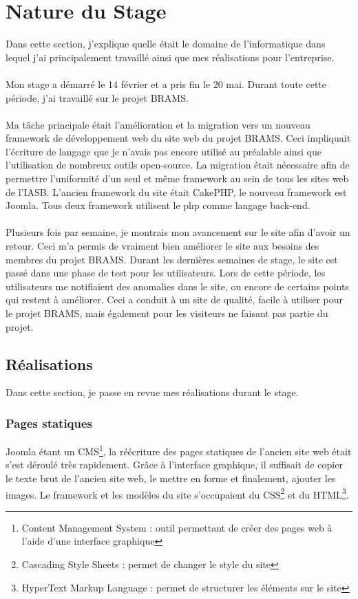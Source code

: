 \documentclass[11pt]{article}
\begin{document}
\section{Nature du Stage}
Dans cette section, j'explique quelle était le domaine de l'informatique dans lequel j'ai principalement travaillé ainsi que mes réalisations pour l'entreprise.\\
\\
Mon stage a démarré le 14 février et a pris fin le 20 mai. Durant toute cette période, j'ai travaillé sur le projet BRAMS.\\
\\
Ma tâche principale était l'amélioration et la migration vers un nouveau framework de développement web du site web du projet BRAMS.
Ceci impliquait l'écriture de langage que je n'avais pas encore utilisé au préalable ainsi que l'utilisation de nombreux outils open-source.
La migration était nécessaire afin de permettre l'uniformité d'un seul et même framework au sein de tous les sites web de l'IASB.
L'ancien framework du site était CakePHP, le nouveau framework est Joomla. Tous deux framework utilisent le php comme langage back-end.\\
\\
Plusieurs fois par semaine, je montrais mon avancement sur le site afin d'avoir un retour.
Ceci m'a permis de vraiment bien améliorer le site aux besoins des membres du projet BRAMS.
Durant les dernières semaines de stage, le site est passé dans une phase de test pour les utilisateurs.
Lors de cette période, les utilisateurs me notifiaient des anomalies dans le site, ou encore de certains points qui restent à améliorer.
Ceci a conduit à un site de qualité, facile à utiliser pour le projet BRAMS, mais également pour les visiteurs ne faisant pas partie du projet.

\subsection{Réalisations}
Dans cette section, je passe en revue mes réalisations durant le stage.

\subsubsection{Pages statiques}
Joomla étant un CMS\footnote{Content Management System : outil permettant de créer des pages web à l'aide d'une interface graphique}, la réécriture des pages statiques de l'ancien site web était s'est déroulé très rapidement.
Grâce à l'interface graphique, il suffisait de copier le texte brut de l'ancien site web, le mettre en forme et finalement, ajouter les images.
Le framework et les modèles du site s'occupaient du CSS\footnote{Cascading Style Sheets : permet de changer le style du site} et du HTML\footnote{HyperText Markup Language : permet de structurer les éléments sur le site}.
\end{document}
